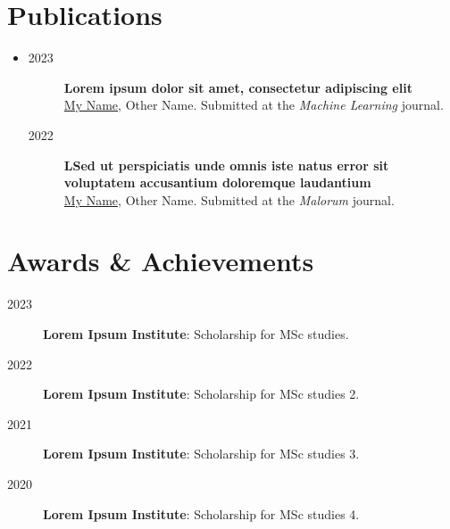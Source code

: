 \documentclass[a4paper,10pt]{article}
\begin{document}
\section*{Publications}
\MyHorizontalRule %
  \vspace{2pt}
  \begin{itemize}[leftmargin=0.15in, label={}, itemsep=-8pt]
    \item \begin{description}

    	\item [\normalfont \textcolor{ColorOne}{2023}] \textbf{Lorem ipsum dolor sit amet, consectetur adipiscing elit}\\
        \vspace{-2pt}\hspace{6pt}\underline{My Name}, Other Name. Submitted at the \textit{Machine Learning} journal.

    	\item [\normalfont \textcolor{ColorOne}{2022}] \textbf{LSed ut perspiciatis unde omnis iste natus error sit voluptatem accusantium doloremque laudantium}\\
        \vspace{-2pt}\hspace{6pt}\underline{My Name}, Other Name. Submitted at the \textit{Malorum} journal.
	
    \end{description}
  \end{itemize}



\section*{Awards \& Achievements}
\MyHorizontalRule %
  \vspace{2pt}
  \begin{itemize}[leftmargin=0.15in, label={}, itemsep=-8pt]
    \begin{description}
    	\item [\normalfont \textcolor{ColorOne}{2023}] \textbf{Lorem Ipsum Institute}: Scholarship for MSc studies.
    	\vspace{-8pt}
    	 
    	\item [\normalfont \textcolor{ColorOne}{2022}] \textbf{Lorem Ipsum Institute}: Scholarship for MSc studies 2.
    	\vspace{-8pt}
    	 
    	\item [\normalfont \textcolor{ColorOne}{2021}] \textbf{Lorem Ipsum Institute}: Scholarship for MSc studies 3.
    	\vspace{-8pt}
    	 
    	\item [\normalfont \textcolor{ColorOne}{2020}] \textbf{Lorem Ipsum Institute}: Scholarship for MSc studies 4.
	
    \end{description}
  \end{itemize}
\end{document}
